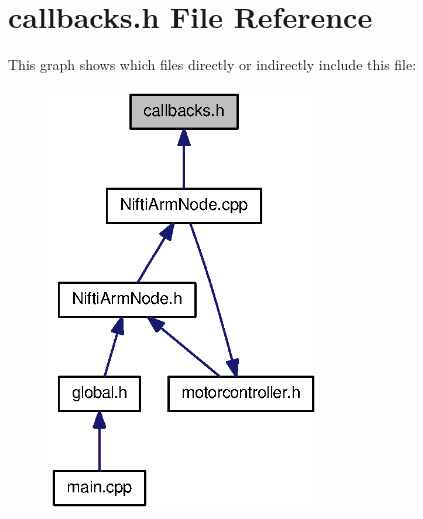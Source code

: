 \section{callbacks.\-h \-File \-Reference}
\label{callbacks_8h}
\-This graph shows which files directly or indirectly include this file\-:
\nopagebreak
\begin{figure}[H]
\begin{center}
\leavevmode
\includegraphics[width=203pt]{callbacks_8h__dep__incl}
\end{center}
\end{figure}
